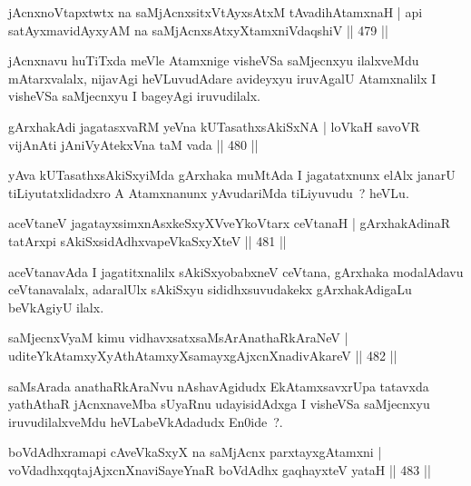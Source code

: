\begin{shl}
jAcnxnoVtapxtwtx na saMjAcnx\s sitxVtAyxsAtxM tAvadihA\s \s tamxnaH |
api satAyxmavidAyxyAM na saMjAcnx\s sAtxyXtamxniVdaqshiV \hfill  || 479 ||
\end{shl}

\begin{artha}
jAcnxnavu huTiTxda meVle Atamxnige visheVSa saMjecnxyu ilalxveMdu mAtarxvalalx, nijavAgi heVLuvudAdare avideyxyu iruvAgalU Atamxnalilx I visheVSa saMjecnxyu I bageyAgi iruvudilalx.
\end{artha}

\begin{shl}
gArxhakAdi jagatasxvaRM yeVna kUTasathxsAkiSxNA |
loVkaH savoVR vijAnAti jAniVyAtekxVna taM vada \hfill  || 480 ||
\end{shl}

\begin{artha}
yAva kUTasathxsAkiSxyiMda gArxhaka muMtAda I jagatatxnunx elAlx janarU
tiLiyutatxlidadxro A Atamxnanunx yAvudariMda tiLiyuvudu~? heVLu.
\end{artha}


\begin{shl}
aceVtaneV jagatayxsimxnAsxkeSxyXVveYkoV\s tarx ceVtanaH |
gArxhakAdinaR tatArxpi sAkiSxsidAdhxvapeVkaSxyXteV \hfill  || 481 ||
\end{shl}

\begin{artha}
aceVtanavAda I jagatitxnalilx sAkiSxyobabxneV ceVtana,  gArxhaka modalAdavu ceVtanavalalx, adaralUlx sAkiSxyu sididhxsuvudakekx gArxhakAdigaLu beVkAgiyU ilalx.
\end{artha}

\begin{shl}
saMjecnxVyaM kimu vidhavxsatxsaMsArAnathaRkAraNeV |
uditeYkAtamxyXyAthAtamxyXsamayxgAjxcnXnadivAkareV \hfill  || 482 ||
\end{shl}

\begin{artha}
saMsArada anathaRkAraNvu nAshavAgidudx EkAtamxsavxrUpa tatavxda yathAthaR jAcnxnaveMba sUyaRnu udayisidAdxga I visheVSa saMjecnxyu iruvudilalxveMdu heVLabeVkAdadudx En0ide~?.
\end{artha}


\begin{shl}
boVdAdhxramapi cAveVkaSxyX na saMjAcnx parxtayxgAtamxni |
voVdadhxqqtajAjxcnXnaviSayeYnaR boVdAdhx gaqhayxteV yataH \hfill  || 483 ||
\end{shl}

